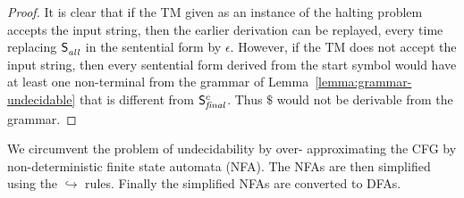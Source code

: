 \documentclass[preprint, 9pt]{sigplanconf}
\begin{document}
\begin{proof}
It is clear that if the TM given as an instance of the halting problem
accepts the input string, then the earlier derivation can be replayed,
every   time   replacing   $\mathsf{S}_{\mathit{\mathit{all}}}^{}$   in   the
sentential form by $\epsilon$. However, if  the TM does not accept the
input string, then every sentential form derived from the start symbol
would    have     at    least    one    non-terminal from the grammar
of Lemma~\ref{lemma:grammar-undecidable} that is different
from $\mathsf{S}_{\mathit{final}}^{c}$.   Thus  $\$$  would  not  be
derivable from the grammar.
\end{proof}


We circumvent  the problem  of undecidability  by over-
approximating the CFG by non-deterministic finite state
automata (NFA). The NFAs  are then simplified using the
$\hookrightarrow$ rules.   Finally the  simplified NFAs
are converted to DFAs.

\end{document}
